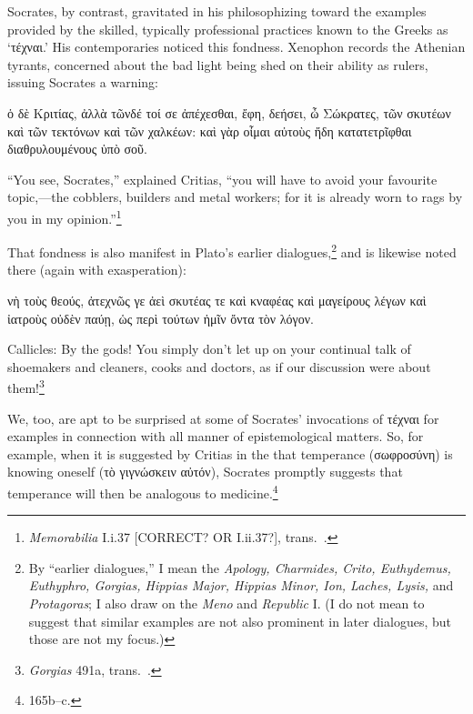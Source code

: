 \documentclass[11pt,letterpaper,oneside]{amsart} %
\begin{document}
Socrates, by contrast, gravitated in his philosophizing toward the examples provided by the skilled, typically professional practices known to the Greeks as `τέχναι.' His contemporaries noticed this fondness. Xenophon records the Athenian tyrants, concerned about the bad light being shed on their ability as rulers, issuing Socrates a warning:\begin{squote}ὁ δὲ Κριτίας, ἀλλὰ τῶνδέ τοί σε ἀπέχεσθαι, ἔφη, δεήσει, ὦ Σώκρατες, τῶν σκυτέων καὶ τῶν τεκτόνων καὶ τῶν χαλκέων: καὶ γὰρ οἶμαι αὐτοὺς ἤδη κατατετρῖφθαι διαθρυλουμένους ὑπὸ σοῦ.

\vspace{0.05in}

\noindent ``You see, Socrates,'' explained Critias, ``you will have to avoid your favourite topic,---the cobblers, builders and metal workers; for it is already worn to rags by you in my opinion.''\footnote{\emph{Memorabilia} I.i.37 [CORRECT? OR I.ii.37?], trans.\ .}\end{squote} That fondness is also manifest in Plato's earlier dialogues,\footnote{By ``earlier dialogues,'' I mean the \emph{Apology, Charmides, Crito, Euthydemus, Euthyphro, Gorgias, Hippias Major, Hippias Minor, Ion, Laches, Lysis,} and \emph{Protagoras}; I also draw on the \emph{Meno} and \emph{Republic} I.\label{dialogues} (I do not mean to suggest that similar examples are not also prominent in later dialogues, but those are not my focus.)} and is likewise noted there (again with exasperation):\begin{squote}νὴ τοὺς θεούς, ἀτεχνῶς γε ἀεὶ σκυτέας τε καὶ κναφέας καὶ μαγείρους λέγων καὶ ἰατροὺς οὐδὲν παύῃ, ὡς περὶ τούτων ἡμῖν ὄντα τὸν λόγον.

\vspace{0.05in}

\noindent Callicles: By the gods! You simply don't let up on your continual talk of shoemakers and cleaners, cooks and doctors, as if our discussion were about them!\footnote{\emph{Gorgias} 491a, trans.\ .}\end{squote} We, too, are apt to be surprised at some of Socrates' invocations of τέχναι for examples in connection with all manner of epistemological matters. So, for example, when it is suggested by Critias in the  that temperance (σωφροσύνη) is knowing oneself (τὸ γιγνώσκειν αὐτόν), Socrates promptly suggests that temperance will then be analogous to medicine.\footnote{165b--c.}
\end{document}
